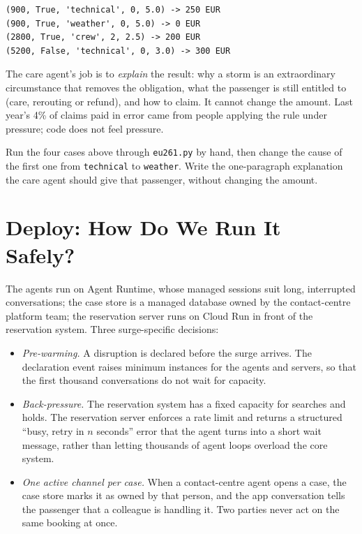 

\begin{lstlisting}[language={}, numbers=none, frame=none, xleftmargin=1.5em]
(900, True, 'technical', 0, 5.0) -> 250 EUR
(900, True, 'weather', 0, 5.0) -> 0 EUR
(2800, True, 'crew', 2, 2.5) -> 200 EUR
(5200, False, 'technical', 0, 3.0) -> 300 EUR
\end{lstlisting}

The care agent's job is to \emph{explain} the result: why a storm is an extraordinary circumstance that removes the obligation, what the passenger is still entitled to (care, rerouting or refund), and how to claim. It cannot change the amount. Last year's 4\% of claims paid in error came from people applying the rule under pressure; code does not feel pressure.

\begin{tryit}
Run the four cases above through \texttt{eu261.py} by hand, then change the cause of the first one from \texttt{technical} to \texttt{weather}. Write the one-paragraph explanation the care agent should give that passenger, without changing the amount.
\end{tryit}

\section{Deploy: How Do We Run It Safely?}
\label{sec:air-deploy}

The agents run on Agent Runtime, whose managed sessions suit long, interrupted conversations; the case store is a managed database owned by the contact-centre platform team; the reservation server runs on Cloud Run in front of the reservation system. Three surge-specific decisions:
\begin{itemize}[itemsep=1pt]
  \item \emph{Pre-warming.} A disruption is declared before the surge arrives. The declaration event raises minimum instances for the agents and servers, so that the first thousand conversations do not wait for capacity.
  \item \emph{Back-pressure.} The reservation system has a fixed capacity for searches and holds. The reservation server enforces a rate limit and returns a structured ``busy, retry in $n$ seconds'' error that the agent turns into a short wait message, rather than letting thousands of agent loops overload the core system.
  \item \emph{One active channel per case.} When a contact-centre agent opens a case, the case store marks it as owned by that person, and the app conversation tells the passenger that a colleague is handling it. Two parties never act on the same booking at once.
\end{itemize}

